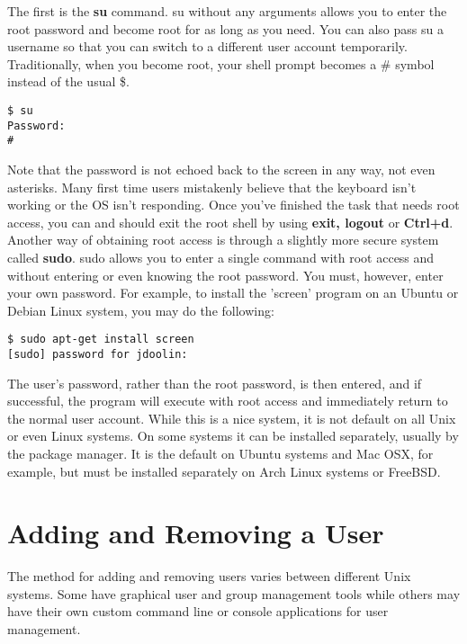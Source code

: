 The first is the \textbf{su} command.  su without any arguments allows you to enter the root password and become root for as long as you need.  You can also pass su a username so that you can switch to a different user account temporarily.  Traditionally, when you become root, your shell prompt becomes a \# symbol instead of the usual \$.

\begin{verbatim}
$ su
Password:
# 
\end{verbatim}

Note that the password is not echoed back to the screen in any way, not even asterisks.  Many first time users mistakenly believe that the keyboard isn't working or the OS isn't responding.  Once you've finished the task that needs root access, you can and should exit the root shell by using \textbf{exit, logout} or \textbf{Ctrl+d}.\\

Another way of obtaining root access is through a slightly more secure system called \textbf{sudo}.  sudo allows you to enter a single command with root access and without entering or even knowing the root password.  You must, however, enter your own password.  For example, to install the 'screen' program on an Ubuntu or Debian Linux system, you may do the following:

\begin{verbatim}
$ sudo apt-get install screen
[sudo] password for jdoolin:
\end{verbatim}

The user's password, rather than the root password, is then entered, and if successful, the program will execute with root access and immediately return to the normal user account.  While this is a nice system, it is not default on all Unix or even Linux systems.  On some systems it can be installed separately, usually by the package manager.  It is the default on Ubuntu systems and Mac OSX, for example, but must be installed separately on Arch Linux systems or FreeBSD.

\section{Adding and Removing a User}

The method for adding and removing users varies between different Unix systems.  Some have graphical user and group management tools while others may have their own custom command line or console applications for user management.\\

